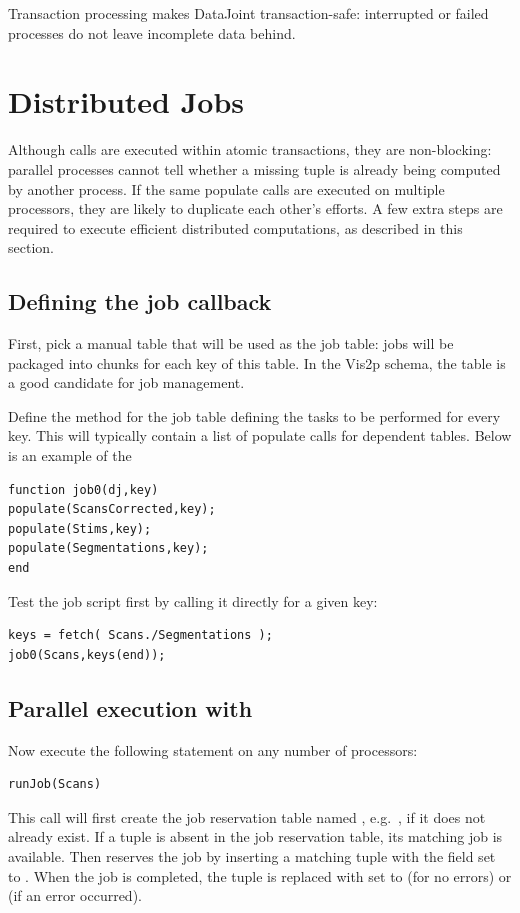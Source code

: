\documentclass[10pt]{article}
\begin{document}
Transaction processing makes DataJoint transaction-safe: interrupted or failed processes do not leave incomplete data behind.


\newpage\section{Distributed Jobs}
Although  calls are executed within atomic transactions, they are non-blocking: parallel processes cannot tell whether a missing tuple is already being computed by another process.  If the same populate calls are executed on multiple processors, they are likely to duplicate each other's efforts.  A few extra steps are required to execute efficient distributed computations, as described in this section.

\subsection{Defining the job callback}
First, pick a manual table that will be used as the job table: jobs will be packaged into chunks for each key of this table.  In the Vis2p schema, the  table is a good candidate for job management. 

Define the method  for the job table defining the tasks to be performed for every key. This will typically contain a list of populate calls for dependent tables. Below is an example of the 
\begin{lstlisting}
function job0(dj,key)
populate(ScansCorrected,key);
populate(Stims,key);
populate(Segmentations,key);
end
\end{lstlisting}

Test the job script first by calling it directly for a given key:
\begin{lstlisting}
keys = fetch( Scans./Segmentations );
job0(Scans,keys(end));
\end{lstlisting}

\subsection{Parallel execution with }
Now execute the following statement on any number of processors:
\begin{lstlisting}
runJob(Scans)
\end{lstlisting}
This call will first create the job reservation table named , e.g.~, if it does not already exist. If a tuple is absent in the job reservation table, its matching job is available.  
Then  reserves the job by inserting a matching tuple with the  field set to .  When the job is completed, the tuple is replaced with  set to  (for no errors) or  (if an error occurred).  
\end{document}
